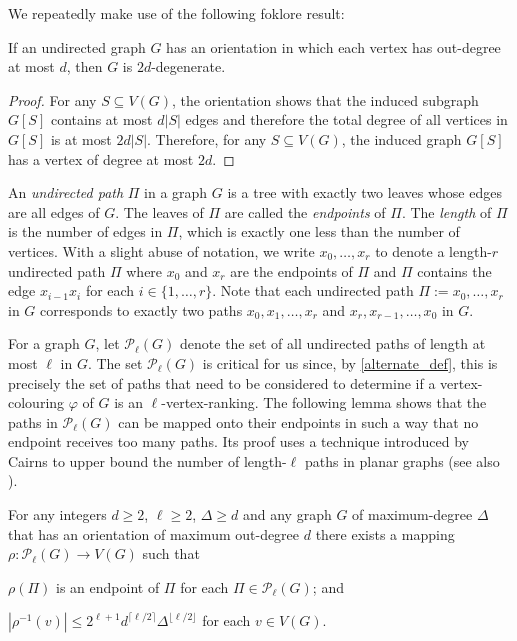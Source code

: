 \documentclass{patmorin}
\newcommand{\defin}[1]{\emph{\color{brightmaroon}#1}}
\begin{document}
We repeatedly make use of the following foklore result:

\begin{obs}\label{orientation_to_degeneracy}
  If an undirected graph $G$ has an orientation in which each vertex has out-degree at most $d$, then $G$ is $2d$-degenerate.
\end{obs}

\begin{proof}
  For any $S\subseteq V(G)$, the orientation shows that the induced subgraph $G[S]$ contains at most $d|S|$ edges and therefore the total degree of all vertices in $G[S]$ is at most $2d|S|$.  Therefore, for any $S\subseteq V(G)$, the induced graph $G[S]$ has a vertex of degree at most $2d$.
\end{proof}

An \defin{undirected path} $\Pi$ in a graph $G$ is a tree with exactly two leaves whose edges are all edges of $G$. The leaves of $\Pi$ are called the \defin{endpoints} of $\Pi$. The \defin{length} of $\Pi$ is the number of edges in $\Pi$, which is exactly one less than the number of vertices.  With a slight abuse of notation, we write $x_0,\ldots,x_r$ to denote a length-$r$ undirected path $\Pi$ where $x_0$ and $x_r$ are the endpoints of $\Pi$ and $\Pi$ contains the edge $x_{i-1}x_i$ for each $i\in\{1,\ldots,r\}$.  Note that each undirected path $\Pi:=x_0,\ldots,x_r$ in $G$ corresponds to exactly two paths $x_0,x_1,\ldots,x_r$ and $x_r,x_{r-1},\ldots,x_0$ in $G$.

For a graph $G$, let $\mathcal{P}_\ell(G)$ denote the set of all undirected paths of length at most $\ell$ in $G$.  The set $\mathcal{P}_\ell(G)$ is critical for us since, by \cref{alternate_def}, this is precisely the set of paths that need to be considered to determine if a vertex-colouring $\varphi$ of $G$ is an $\ell$-vertex-ranking.  The following lemma shows that the paths in $\mathcal{P}_\ell(G)$ can be mapped onto their endpoints in such a way that no endpoint receives too many paths.  Its proof uses a technique introduced by Cairns to upper bound the number of length-$\ell$ paths in planar graphs (see also \cite[Lemma~5]{devroye.dujmovic.ea:notes}).

\begin{lem}\label{advanced_cairns}
  For any integers $d\ge 2$, $\ell\ge 2$, $\Delta\ge d$ and any
  graph $G$ of maximum-degree $\Delta$ that has an orientation of maximum out-degree $d$ there exists a mapping $\rho:\mathcal{P}_\ell(G)\to V(G)$ such that
  \begin{compactenum}[(i)]
    \item $\rho(\Pi)$ is an endpoint of $\Pi$ for each $\Pi\in\mathcal{P}_\ell(G)$; and
    \item $|\rho^{-1}(v)| \le 2^{\ell+1}d^{\lceil \ell/2\rceil}\Delta^{\lfloor\ell/2\rfloor}$ for each $v\in V(G)$.
  \end{compactenum}
\end{lem}
\end{document}
